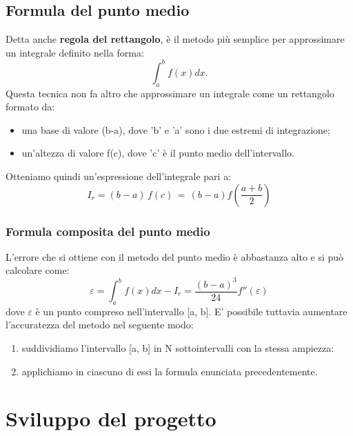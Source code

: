 \documentclass{article}
\begin{document}
\subsection{Formula del punto medio}
Detta anche \textbf{regola del rettangolo}, è il metodo più semplice per approssimare un integrale definito nella forma:
\begin{equation*}
   \int_{a}^{b} f(x) dx.
\end{equation*}
Questa tecnica non fa altro che approssimare un integrale come un rettangolo formato da:
\begin{itemize}
   \item una base di valore (b-a), dove 'b' e 'a' sono i due estremi di integrazione;
   \item un'altezza di valore f(c), dove 'c' è il punto medio dell'intervallo.
\end{itemize}
Otteniamo quindi un'espressione dell'integrale pari a:
\begin{equation*}
   I_{r} = (b-a)\,f(c)\,=\,(b-a)f \left( \frac{a+b}{2}  \right)
\end{equation*}
\subsubsection{Formula composita del punto medio}
L'errore che si ottiene con il metodo del punto medio è abbastanza alto e si può calcolare come:
\begin{equation*}
   \varepsilon = \int_{a}^{b} f(x) dx - I_r = \frac{(b-a)^3}{24}f''(\varepsilon)
\end{equation*}
dove $\varepsilon$ è un punto compreso nell'intervallo [a, b]. E' possibile tuttavia aumentare l'accuratezza
del metodo nel seguente modo:
\begin{enumerate}
   \item suddividiamo l'intervallo [a, b] in N sottointervalli con la stessa ampiezza:
   \item applichiamo in ciascuno di essi la formula enunciata precedentemente.
\end{enumerate}
\section{Sviluppo del progetto}
\end{document}
